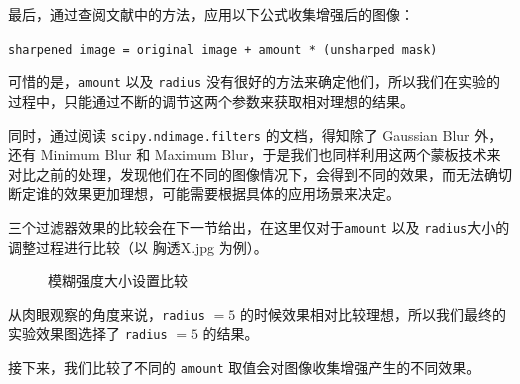 \documentclass[11pt]{ctexart}
\begin{document}
最后，通过查阅文献中的方法，应用以下公式收集增强后的图像：

\texttt{sharpened image = original image + amount * (unsharped mask)}

可惜的是，\texttt{amount} 以及 \texttt{radius} 没有很好的方法来确定他们，所以我们在实验的过程中，只能通过不断的调节这两个参数来获取相对理想的结果。

同时，通过阅读 \texttt{scipy.ndimage.filters} 的文档，得知除了 Gaussian Blur 外，还有 Minimum Blur 和 Maximum Blur，于是我们也同样利用这两个蒙板技术来对比之前的处理，发现他们在不同的图像情况下，会得到不同的效果，而无法确切断定谁的效果更加理想，可能需要根据具体的应用场景来决定。

三个过滤器效果的比较会在下一节给出，在这里仅对于\texttt{amount} 以及 \texttt{radius}大小的调整过程进行比较（以 胸透X.jpg 为例）。

   \begin{figure}[htbp]
        \centering
        \centering
        \caption{模糊强度大小设置比较}\label{fig:digit}
  \end{figure}

\newpage

从肉眼观察的角度来说，\texttt{radius} $=5$ 的时候效果相对比较理想，所以我们最终的实验效果图选择了 \texttt{radius} $=5$ 的结果。

接下来，我们比较了不同的 \texttt{amount} 取值会对图像收集增强产生的不同效果。
\end{document}
